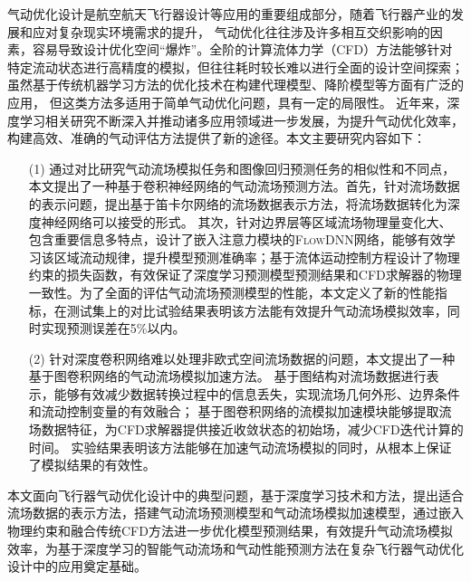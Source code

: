 \begin{cabstract}

气动优化设计是航空航天飞行器设计等应用的重要组成部分，随着飞行器产业的发展和应对复杂现实环境需求的提升，
气动优化往往涉及许多相互交织影响的因素，容易导致设计优化空间“爆炸”。全阶的计算流体力学（CFD）方法能够针对特定流动状态进行高精度的模拟，但往往耗时较长难以进行全面的设计空间探索；虽然基于传统机器学习方法的优化技术在构建代理模型、降阶模型等方面有广泛的应用，
但这类方法多适用于简单气动优化问题，具有一定的局限性。
近年来，深度学习相关研究不断深入并推动诸多应用领域进一步发展，为提升气动优化效率，
构建高效、准确的气动评估方法提供了新的途径。本文主要研究内容如下：

\begin{itemize}
	\item[(1)] 通过对比研究气动流场模拟任务和图像回归预测任务的相似性和不同点，本文提出了一种基于卷积神经网络的气动流场预测方法。首先，针对流场数据的表示问题，提出基于笛卡尔网络的流场数据表示方法，将流场数据转化为深度神经网络可以接受的形式。
	其次，针对边界层等区域流场物理量变化大、包含重要信息多特点，设计了嵌入注意力模块的\textsc{FlowDNN}网络，能够有效学习该区域流动规律，提升模型预测准确率；基于流体运动控制方程设计了物理约束的损失函数，有效保证了深度学习预测模型预测结果和CFD求解器的物理一致性。为了全面的评估气动流场预测模型的性能，本文定义了新的性能指标，在测试集上的对比试验结果表明该方法能有效提升气动流场模拟效率，同时实现预测误差在5\%以内。
	\item[(2)] 针对深度卷积网络难以处理非欧式空间流场数据的问题，本文提出了一种基于图卷积网络的气动流场模拟加速方法。
	基于图结构对流场数据进行表示，能够有效减少数据转换过程中的信息丢失，实现流场几何外形、边界条件和流动控制变量的有效融合；
	基于图卷积网络的流模拟加速模块能够提取流场数据特征，为CFD求解器提供接近收敛状态的初始场，减少CFD迭代计算的时间。
	实验结果表明该方法能够在加速气动流场模拟的同时，从根本上保证了模拟结果的有效性。
	
\end{itemize}

本文面向飞行器气动优化设计中的典型问题，基于深度学习技术和方法，提出适合流场数据的表示方法，搭建气动流场预测模型和气动流场模拟加速模型，通过嵌入物理约束和融合传统CFD方法进一步优化模型预测结果，有效提升气动流场模拟效率，为基于深度学习的智能气动流场和气动性能预测方法在复杂飞行器气动优化设计中的应用奠定基础。

\end{cabstract}



